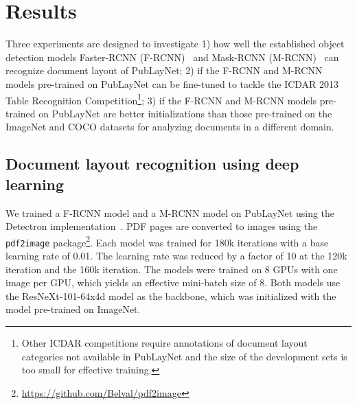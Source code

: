 \documentclass[conference]{IEEEtran}
\begin{document}
\section{Results}

Three experiments are designed to investigate 1) how well the established object detection models Faster-RCNN (F-RCNN)~\cite{ren2015faster} and Mask-RCNN (M-RCNN)~\cite{he2017mask} can recognize document layout of PubLayNet; 2) if the F-RCNN and M-RCNN models pre-trained on PubLayNet can be fine-tuned to tackle the ICDAR 2013 Table Recognition Competition\footnote{Other ICDAR competitions require annotations of document layout categories not available in PubLayNet and the size of the development sets is too small for effective training.}; 3) if the F-RCNN and M-RCNN models pre-trained on PubLayNet are better initializations than those pre-trained on the ImageNet and COCO datasets for analyzing documents in a different domain.

\subsection{Document layout recognition using deep learning}
\label{sec:exp_1}
We trained a F-RCNN model and a M-RCNN model on PubLayNet using the Detectron implementation~\cite{Detectron2018}. PDF pages are converted to images using the \texttt{pdf2image} package\footnote{\url{https://github.com/Belval/pdf2image}}. Each model was trained for 180k iterations with a base learning rate of 0.01. The learning rate was reduced by a factor of 10 at the 120k iteration and the 160k iteration. The models were trained on 8 GPUs with one image per GPU, which yields an effective mini-batch size of 8. Both models use the ResNeXt-101-64x4d model as the backbone, which was initialized with the model pre-trained on ImageNet.
\end{document}
